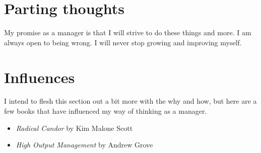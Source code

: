 \documentclass[11pt]{amsart}
\begin{document}








\section{Parting thoughts}
My promise as a manager is that I will strive to do these things and more. I am always open to being wrong. I will never stop growing and improving myself. 


\section{Influences}

I intend to flesh this section out a bit more with the why and how, but here are a few books that have influenced my way of thinking as a manager.

\begin{itemize}
  \item \emph{Radical Candor} by Kim Malone Scott 
  \item \emph{High Output Management} by Andrew Grove
\end{itemize}
\end{document}

